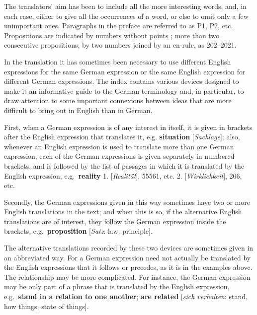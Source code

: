 \begin{center}
\end{center}

\noindent The translators’ aim has been to include all the more interesting words, and, in each case, either to give all the occurrences of a word, or else to omit only a few unimportant ones. Paragraphs in the preface are referred to as P1, P2, etc. Propositions are indicated by numbers without points ; more than two consecutive propositions, by two numbers joined by an en-rule, as 202–2021.

In the translation it has sometimes been necessary to use different English expressions for the same German expression or the same English expression for different German expressions. The index contains various devices designed to make it an informative guide to the German terminology and, in particular, to draw attention to some important connexions between ideas that are more difficult to bring out in English than in German.

First, when a German expression is of any interest in itself, it is given in brackets after the English expression that translates it, e.g. \textbf{situation} [\textit{Sachlage}]; also, whenever an English expression is used to translate more than one German expression, each of the German expressions is given separately in numbered brackets, and is followed by the list of passages in which it is translated by the English expression, e.g.\ \textbf{reality} 1. [\textit{Realität}], 55561, etc. 2. [\textit{Wirklichkeit}], 206, etc.

Secondly, the German expressions given in this way sometimes have two or more English translations in the text; and when this is so, if the alternative English translations are of interest, they follow the German expression inside the brackets, e.g.\ \textbf{proposition} [\textit{Satz}: law; principle].

The alternative translations recorded by these two devices are sometimes given in an abbreviated way. For a German expression need not actually be translated by the English expressions that it follows or precedes, as it is in the examples above. The relationship may be more complicated. For instance, the German expression may be only part of a phrase that is translated by the English expression, e.g.\ \textbf{stand in a relation to one another}; \textbf{are related}
[\textit{sich verhalten}: stand, how things; state of things].

